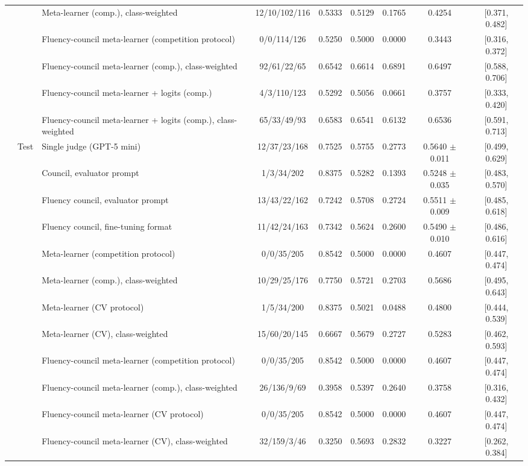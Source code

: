 \begin{tabular}{lllcccccc}
 &  & Meta-learner (comp.), class-weighted & 12/10/102/116 & 0.5333 & 0.5129 & 0.1765 & 0.4254 & [0.371, 0.482] \\
 &  & Fluency-council meta-learner (competition protocol) & 0/0/114/126 & 0.5250 & 0.5000 & 0.0000 & 0.3443 & [0.316, 0.372] \\
 &  & Fluency-council meta-learner (comp.), class-weighted & 92/61/22/65 & 0.6542 & 0.6614 & 0.6891 & 0.6497 & [0.588, 0.706] \\
 &  & Fluency-council meta-learner + logits (comp.) & 4/3/110/123 & 0.5292 & 0.5056 & 0.0661 & 0.3757 & [0.333, 0.420] \\
 &  & Fluency-council meta-learner + logits (comp.), class-weighted & 65/33/49/93 & 0.6583 & 0.6541 & 0.6132 & 0.6536 & [0.591, 0.713] \\
 & Test & Single judge (GPT-5 mini) & 12/37/23/168 & 0.7525 & 0.5755 & 0.2773 & 0.5640 $\pm$ 0.011 & [0.499, 0.629] \\
 &  & Council, evaluator prompt & 1/3/34/202 & 0.8375 & 0.5282 & 0.1393 & 0.5248 $\pm$ 0.035 & [0.483, 0.570] \\
 &  & Fluency council, evaluator prompt & 13/43/22/162 & 0.7242 & 0.5708 & 0.2724 & 0.5511 $\pm$ 0.009 & [0.485, 0.618] \\
 &  & Fluency council, fine-tuning format & 11/42/24/163 & 0.7342 & 0.5624 & 0.2600 & 0.5490 $\pm$ 0.010 & [0.486, 0.616] \\
 &  & Meta-learner (competition protocol) & 0/0/35/205 & 0.8542 & 0.5000 & 0.0000 & 0.4607 & [0.447, 0.474] \\
 &  & Meta-learner (comp.), class-weighted & 10/29/25/176 & 0.7750 & 0.5721 & 0.2703 & 0.5686 & [0.495, 0.643] \\
 &  & Meta-learner (CV protocol) & 1/5/34/200 & 0.8375 & 0.5021 & 0.0488 & 0.4800 & [0.444, 0.539] \\
 &  & Meta-learner (CV), class-weighted & 15/60/20/145 & 0.6667 & 0.5679 & 0.2727 & 0.5283 & [0.462, 0.593] \\
 &  & Fluency-council meta-learner (competition protocol) & 0/0/35/205 & 0.8542 & 0.5000 & 0.0000 & 0.4607 & [0.447, 0.474] \\
 &  & Fluency-council meta-learner (comp.), class-weighted & 26/136/9/69 & 0.3958 & 0.5397 & 0.2640 & 0.3758 & [0.316, 0.432] \\
 &  & Fluency-council meta-learner (CV protocol) & 0/0/35/205 & 0.8542 & 0.5000 & 0.0000 & 0.4607 & [0.447, 0.474] \\
 &  & Fluency-council meta-learner (CV), class-weighted & 32/159/3/46 & 0.3250 & 0.5693 & 0.2832 & 0.3227 & [0.262, 0.384] \\

\end{tabular}
